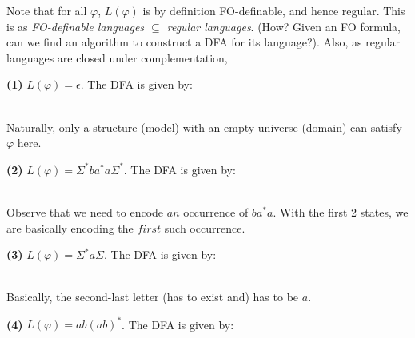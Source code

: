 \documentclass{article}
\begin{document}
\begin{flushleft}
Note that for all $\varphi$, $L(\varphi)$ is by definition FO-definable, and hence regular. This is as \textit{FO-definable languages $\subseteq$ regular languages}. (How? Given an FO formula, can we find an algorithm to construct a DFA for its language?). Also, as regular languages are closed under complementation, 

\textbf{(1)} $L(\varphi) = {\epsilon}.$ The DFA is given by:\vspace{3mm}

 \\
Naturally, only a structure (model) with an empty universe (domain) can satisfy $\varphi$ here.

\textbf{(2)} $L(\varphi) = \Sigma^* b a^* a \Sigma^*$. The DFA is given by:\vspace{3mm}

\\
Observe that we need to encode $an$ occurrence of $b a^* a$. With the first 2 states, we are basically encoding the $first$ such occurrence.

\textbf{(3)} $L(\varphi) = \Sigma^* a \Sigma$. The DFA is given by:\vspace{3mm}

\\
Basically, the second-last letter (has to exist and) has to be $a$.

\textbf{(4)} $L(\varphi) = ab(ab)^*$. The DFA is given by:\vspace{3mm}


\end{flushleft}
\end{document}

